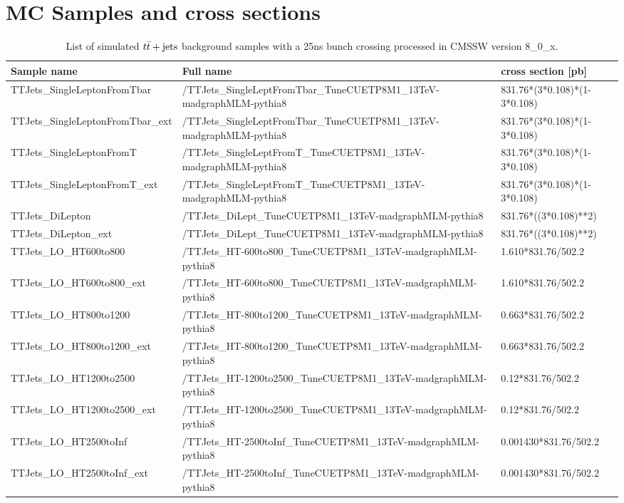 \chapter{MC Samples and cross sections}
\label{sec:Appsamples}

\begin{table}[htbp]
 \tiny
  \vspace{0.2cm}
  \begin{tabular}{|l|l|l|}
    \hline
    Sample name & Full name & cross section [pb] \\
    \hline
    TTJets\_SingleLeptonFromTbar & /TTJets\_SingleLeptFromTbar\_TuneCUETP8M1\_13TeV-madgraphMLM-pythia8 & 831.76*(3*0.108)*(1-3*0.108)  \\
    TTJets\_SingleLeptonFromTbar\_ext & /TTJets\_SingleLeptFromTbar\_TuneCUETP8M1\_13TeV-madgraphMLM-pythia8 & 831.76*(3*0.108)*(1-3*0.108)  \\
    TTJets\_SingleLeptonFromT & /TTJets\_SingleLeptFromT\_TuneCUETP8M1\_13TeV-madgraphMLM-pythia8 & 831.76*(3*0.108)*(1-3*0.108) \\
    TTJets\_SingleLeptonFromT\_ext & /TTJets\_SingleLeptFromT\_TuneCUETP8M1\_13TeV-madgraphMLM-pythia8 & 831.76*(3*0.108)*(1-3*0.108) \\
    TTJets\_DiLepton & /TTJets\_DiLept\_TuneCUETP8M1\_13TeV-madgraphMLM-pythia8 & 831.76*((3*0.108)**2)  \\
    TTJets\_DiLepton\_ext & /TTJets\_DiLept\_TuneCUETP8M1\_13TeV-madgraphMLM-pythia8 & 831.76*((3*0.108)**2)  \\
    TTJets\_LO\_HT600to800 & /TTJets\_HT-600to800\_TuneCUETP8M1\_13TeV-madgraphMLM-pythia8 & 1.610*831.76/502.2 \\
    TTJets\_LO\_HT600to800\_ext & /TTJets\_HT-600to800\_TuneCUETP8M1\_13TeV-madgraphMLM-pythia8 & 1.610*831.76/502.2 \\
    TTJets\_LO\_HT800to1200 & /TTJets\_HT-800to1200\_TuneCUETP8M1\_13TeV-madgraphMLM-pythia8 & 0.663*831.76/502.2 \\
    TTJets\_LO\_HT800to1200\_ext & /TTJets\_HT-800to1200\_TuneCUETP8M1\_13TeV-madgraphMLM-pythia8 & 0.663*831.76/502.2 \\
    TTJets\_LO\_HT1200to2500 & /TTJets\_HT-1200to2500\_TuneCUETP8M1\_13TeV-madgraphMLM-pythia8 & 0.12*831.76/502.2 \\
    TTJets\_LO\_HT1200to2500\_ext & /TTJets\_HT-1200to2500\_TuneCUETP8M1\_13TeV-madgraphMLM-pythia8 & 0.12*831.76/502.2 \\
    TTJets\_LO\_HT2500toInf & /TTJets\_HT-2500toInf\_TuneCUETP8M1\_13TeV-madgraphMLM-pythia8 & 0.001430*831.76/502.2 \\
    TTJets\_LO\_HT2500toInf\_ext & /TTJets\_HT-2500toInf\_TuneCUETP8M1\_13TeV-madgraphMLM-pythia8 & 0.001430*831.76/502.2 \\
     \hline
  \end{tabular}
  \caption{List of simulated $t\bar{t}+\textrm{jets}$ background samples with a 25ns bunch crossing processed in CMSSW version 8\_0\_x.}
  \label{tab:ttsamples}
\end{table}

